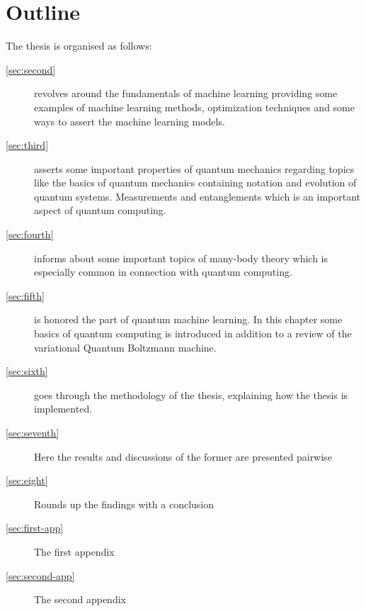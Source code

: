\documentclass[../main.tex]{subfiles}
\begin{document}
\begin{comment}
\begin{table}[hbtp]
    \centering
    \begin{tabular}{@{}*{2}{p{0.5\textwidth}}@{}}
        \toprule
        \textbf{Correct} &  \textbf{Incorrect}
        \\
        \midrule
        \enquote{This is an \enquote{inner quote} inside an outer quote}
        &
        'This is an "inner quote" inside an outer quote'
        \\
        \bottomrule
    \end{tabular}
    \caption[Quotation marks]
    {Proper quotation mark usage.
    The \texttt{\textbackslash enquote} command chooses the correct
    quotation marks for the specified language.}
\end{table}
\end{comment}

\section{Outline}
The thesis is organised as follows:
\begin{description}
    \item[\cref{sec:second}]
    revolves around the fundamentals of machine learning providing some examples of machine learning methods, optimization techniques and some ways to assert the machine learning models.

    \item[\cref{sec:third}]
    asserts some important properties of quantum mechanics regarding topics like the basics of quantum mechanics containing notation and evolution of quantum systems. Measurements and entanglements which is an important aspect of quantum computing.

    \item[\cref{sec:fourth}]
    informs about some important topics of many-body theory which is especially common in connection with quantum computing.
    
    \item[\cref{sec:fifth}]
    is honored the part of quantum machine learning. In this chapter some basics of quantum computing is introduced in addition to a review of the variational Quantum Boltzmann machine. 
    
    \item[\cref{sec:sixth}]
    goes through the methodology of the thesis, explaining how the thesis is implemented.
    
    \item[\cref{sec:seventh}]
    Here the results and discussions of the former are presented pairwise
    
    \item[\cref{sec:eight}]
    Rounds up the findings with a conclusion
    
    \item[\cref{sec:first-app}]
    The first appendix 

    \item[\cref{sec:second-app}]
    The second appendix
\end{description}
\end{document}
